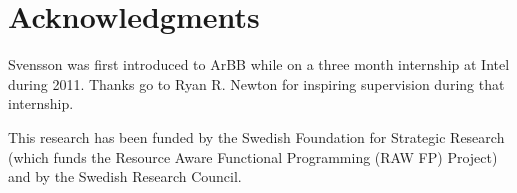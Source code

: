 %

 



\section*{Acknowledgments}
Svensson was first introduced to ArBB while on a three month internship at Intel
during 2011. Thanks go to Ryan R. Newton for inspiring supervision 
during that internship.

This research has been funded by the Swedish Foundation for
Strategic Research (which funds the Resource Aware Functional 
Programming (RAW FP) Project) and by the
Swedish Research Council.




%




